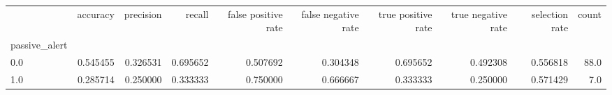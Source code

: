 \begin{tabular}{lrrrrrrrrr}
\toprule
{} &  accuracy &  precision &    recall &  false positive rate &  false negative rate &  true positive rate &  true negative rate &  selection rate &  count \\
passive\_alert &           &            &           &                      &                      &                     &                     &                 &        \\
\midrule
0.0           &  0.545455 &   0.326531 &  0.695652 &             0.507692 &             0.304348 &            0.695652 &            0.492308 &        0.556818 &   88.0 \\
1.0           &  0.285714 &   0.250000 &  0.333333 &             0.750000 &             0.666667 &            0.333333 &            0.250000 &        0.571429 &    7.0 \\
\bottomrule
\end{tabular}
